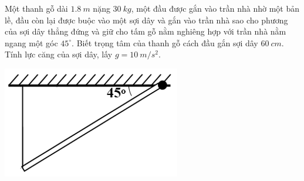 \begin{enumerate}[label=\bfseries Câu \arabic*:]
	\cauhoi
	{Một thanh gỗ dài $\SI{1,8}{m}$ nặng $\SI{30}{kg}$, một đầu được gắn vào trần nhà nhờ một bản lề, đầu còn lại được buộc vào một sợi dây và gắn vào trần nhà sao cho phương của sợi dây thẳng đứng và giữ cho tấm gỗ nằm nghiêng hợp với trần nhà nằm ngang một góc $45^{\circ}$. Biết trọng tâm của thanh gỗ cách đầu gắn sợi dây $\SI{60}{cm}$. Tính lực căng của sợi dây, lấy $g=\SI[parse-numbers=false]{10}{m/s^2}$.
		\begin{center}
			\includegraphics[scale=0.7]{../figs/VN10-2021-PH-TP021-1.png}
		\end{center} 
	}
	

\end{enumerate}
